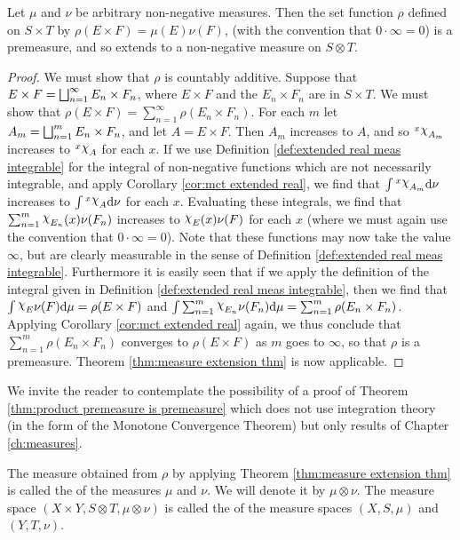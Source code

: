 \begin{theorem}\label{thm:product premeasure is premeasure}
Let $\mu$ and $\nu$ be arbitrary non-negative measures. Then the set function $\rho$ defined on $S\times T$ by $\rho(E\times F)=\mu(E)\nu(F)$, (with the convention that $0\cdot\infty=0$) is a premeasure, and so extends to a non-negative measure on $S\otimes T$.
\end{theorem}

\begin{proof}
We must show that $\rho$ is countably additive. Suppose that $E\times F=\bigsqcup_{n=1}^\infty E_n\times F_n$, where $E\times F$ and the $E_n\times F_n$ are in $S\times T$. We must show that $\rho(E\times F)=\sum_{n=1}^\infty\rho(E_n\times F_n)$. For each $m$ let $A_m=\bigsqcup_{n=1}^mE_n\times F_n$, and let $A=E\times F$. Then $A_m$ increases to $A$, and so $\xsec{\idf{A_m}}{x}$ increases to $\xsec{\idf{A}}{x}$ for each $x$. If we use Definition \ref{def:extended real meas integrable} for the integral of non-negative functions which are not necessarily integrable, and apply Corollary \ref{cor:mct extended real}, we find that $\int\xsec{\idf{A_m}}{x}\dd\nu$ increases to $\int\xsec{\idf{A}}{x}\dd\nu$ for each $x$. Evaluating these integrals, we find that $\sum_{n=1}^m\idf{E_n}(x)\nu(F_n)$ increases to $\idf{E}(x)\nu(F)$ for each $x$ (where we must again use the convention that $0\cdot\infty=0$). Note that these functions may now take the value $\infty$, but are clearly measurable in the sense of Definition \ref{def:extended real meas integrable}. Furthermore it is easily seen that if we apply the definition of the integral given in Definition \ref{def:extended real meas integrable}, then we find that $\int\idf{E}\nu(F)\dd\mu=\rho(E\times F)$ and $\int\sum_{n=1}^m\idf{E_n}\nu(F_n)\dd\mu=\sum_{n=1}^m\rho(E_n\times F_n)$. Applying Corollary \ref{cor:mct extended real} again, we thus conclude that $\sum_{n=1}^m\rho(E_n\times F_n)$ converges to $\rho(E\times F)$ as $m$ goes to $\infty$, so that $\rho$ is a premeasure. Theorem \ref{thm:measure extension thm} is now applicable.
\end{proof}

We invite the reader to contemplate the possibility of a proof of Theorem \ref{thm:product premeasure is premeasure} which does not use integration theory (in the form of the Monotone Convergence Theorem) but only results of Chapter \ref{ch:measures}.

\begin{definition}
The measure obtained from $\rho$ by applying Theorem \ref{thm:measure extension thm} is called the  of the measures $\mu$ and $\nu$. We will denote it by $\mu\otimes\nu$. The measure space $(X\times Y, S\otimes T,\mu\otimes\nu)$ is called the  of the measure spaces $(X,S,\mu)$ and $(Y,T,\nu)$.
\end{definition}

